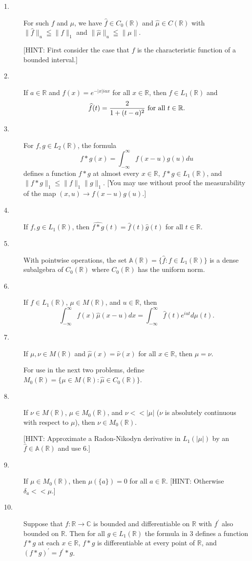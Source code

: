 \documentclass{article}
\def\R{\mathbb R}
\def\C{\mathbb C}
\def\A{\mathbb A}
\begin{document}
\begin{description}
\item[1.]
For such $f$ and $\mu$, we have $\widehat f \in C_0(\R)$ and
$\widehat \mu \in C(\R)$ with
$\parallel \widehat f \parallel_u \leqq \parallel f \parallel_1$
and $\parallel \widehat \mu \parallel_u \leqq \parallel \mu \parallel$.

[HINT: First consider the case that $f$ is the characteristic function of
a bounded interval.]

\item[2.]
If $a \in \R$ and $f(x) = e^{-|x|iax}$ for all $x \in \R$, then
$f \in L_1 (\R)$ and
$$\widehat f (t) = \frac{2}{1+(t-a)^2} \hbox{\ for\ } \hbox{all\ }
  t \in \R.$$

\item[3.]
For $f,g \in L_2 (\R)$, the formula
$$f \ast g(x) = \int^\infty_{-\infty} f(x-u) g(u) du$$
defines a function $f \ast g$ at almost every $x \in \R$,
$f \ast g \in L_1 (\R)$, and
$\parallel f \ast g \parallel_1 \leq \parallel f \parallel_1
 \parallel g \parallel_1$.
[You may use without proof the measurability of the map
$(x,u) \to f(x-u)g(u)$.]

\item[4.]
If $f,g \in L_1 (\R)$, then
$\widehat{f \ast g} (t) = \widehat f(t) \widehat g(t)$ for all
$t \in \R$.

\item[5.]
With pointwise operations, the set $\A(\R) = \{\widehat f:f \in L_1(\R)\}$
is a dense subalgebra of $C_0(\R)$ where $C_0(\R)$ has the uniform norm.

\item[6.]
If $f \in L_1(\R)$, $\mu \in M(\R)$, and $u \in \R$, then
$$\int^\infty_{-\infty} f(x) \widehat \mu (x-u)dx = \int^\infty_{-\infty}
  \widehat f(t) e^{iut} d\mu (t).$$

\item[7.]
If $\mu, \nu \in M(\R)$ and $\widehat \mu (x)= \widehat \nu (x)$ for all
$x \in \R$, then $\mu = \nu$.

For use in the next two problems, define
$M_0(\R) = \{\mu \in M(\R): \widehat \mu \in C_0(\R)\}$.

\item[8.]
If $\nu \in M(\R)$, $\mu \in M_0(\R)$, and $\nu << |\mu|$ ($\nu$ is
absolutely continuous with respect to $\mu$), then $\nu \in M_0(\R)$.

[HINT: Approximate a Radon-Nikodyn derivative in
$L_1(|\mu|)$ by an $\widehat f \in \A (\R)$ and use 6.]

\item[9.]
If $\mu \in M_0 (\R)$, then $\mu(\{a\})=0$ for all $a \in \R$.
[HINT: Otherwise $\delta_a << \mu$.]

\item[10.]
Suppose that $f: \R \to \C$ is bounded and differentiable on $\R$ with
$f^\prime$ also bounded on $\R$. Then for all $g \in L_1(\R)$ the formula
in 3 defines a function $f \ast g$ at each $x \in \R$, $f \ast g$ is
differentiable at every point of $\R$, and
$(f \ast g)^\prime = f^\prime \ast g$.





\end{description}    
\end{document}
